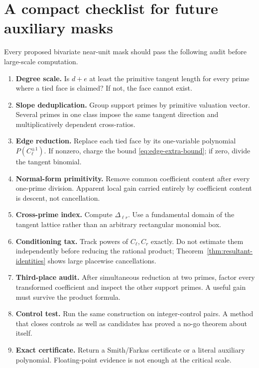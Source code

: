 \documentclass[11pt,oneside]{article}
\theoremstyle{definition}
\theoremstyle{remark}
\begin{document}
\section{A compact checklist for future auxiliary masks}
\label{app:checklist}

Every proposed bivariate near-unit mask should pass the following audit before large-scale
computation.

\begin{enumerate}
\item \textbf{Degree scale.}  Is $d+e$ at least the primitive tangent length for every prime
where a tied face is claimed?  If not, the face cannot exist.
\item \textbf{Slope deduplication.}  Group support primes by primitive valuation vector.
Several primes in one class impose the same tangent direction and multiplicatively dependent
cross-ratios.
\item \textbf{Edge reduction.}  Replace each tied face by its one-variable polynomial
$P(C_\ell^{\pm1})$.  If nonzero, charge the bound
\eqref{eq:edge-extra-bound}; if zero, divide the tangent binomial.
\item \textbf{Normal-form primitivity.}  Remove common coefficient content after every
one-prime division.  Apparent local gain carried entirely by coefficient content is descent,
not cancellation.
\item \textbf{Cross-prime index.}  Compute $\Delta_{\ell r}$.  Use a fundamental domain of
the tangent lattice rather than an arbitrary rectangular monomial box.
\item \textbf{Conditioning tax.}  Track powers of $C_\ell,C_r$ exactly.  Do not estimate them
independently before reducing the rational product; Theorem~\ref{thm:resultant-identities}
shows large placewise cancellations.
\item \textbf{Third-place audit.}  After simultaneous reduction at two primes, factor every
transformed coefficient and inspect the other support primes.  A useful gain must survive the
product formula.
\item \textbf{Control test.}  Run the same construction on integer-control pairs.  A method
that closes controls as well as candidates has proved a no-go theorem about itself.
\item \textbf{Exact certificate.}  Return a Smith/Farkas certificate or a literal auxiliary
polynomial.  Floating-point evidence is not enough at the critical scale.
\end{enumerate}
\end{document}
